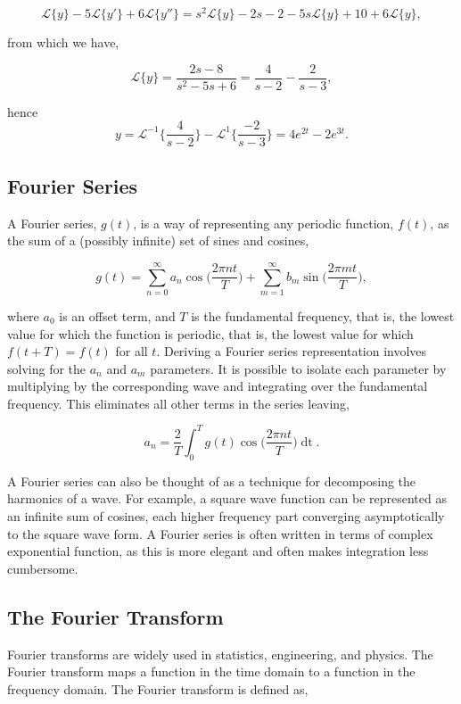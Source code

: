 \documentclass[11pt]{amsart}
\begin{document}
$$\mathcal{L}\{y\} - 5\mathcal{L}\{y'\} + 6\mathcal{L}\{y''\} = s^2\mathcal{L}\{y\} - 2s - 2 - 5s\mathcal{L}\{y\} +10 + 6\mathcal{L}\{y\},$$

from which we have,

$$\mathcal{L}\{y\} = \frac{2s - 8}{s^2 - 5s + 6} = \frac{4}{s - 2} - \frac{2}{s - 3},$$

hence $$y = \mathcal{L}^{-1}\bigg\{\frac{4}{s - 2}\bigg\} - \mathcal{L}^{1}\bigg\{\frac{-2}{s - 3}\bigg\} = 4e^{2t} - 2e^{3t}.$$

\subsection{Fourier Series}

A Fourier series, $g(t)$, is a way of representing any periodic function, $f(t)$, as the sum of a (possibly infinite) set of sines and cosines,

$$g(t) = \sum_{n=0}^{\infty}a_n\cos\bigg(\frac{2\pi nt}{T}\bigg) + \sum_{m=1}^{\infty}b_m\sin\bigg(\frac{2\pi mt}{T}\bigg),$$

where $a_0$ is an offset term, and $T$ is the fundamental frequency, that is, the lowest value for which the function is periodic, that is, the lowest value for which $f(t + T) = f(t)$ for all $t$. Deriving a Fourier series representation involves solving for the $a_n$ and $a_m$ parameters. It is possible to isolate each parameter by multiplying by the corresponding wave and integrating over the fundamental frequency. This eliminates all other terms in the series leaving,

$$a_n = \frac{2}{T}\int_0^Tg(t)\cos\bigg(\frac{2\pi nt}{T}\bigg)\mathop{dt}.$$

A Fourier series can also be thought of as a technique for decomposing the harmonics of a wave. For example, a square wave function can be represented as an infinite sum of cosines, each higher frequency part converging asymptotically to the square wave form. A Fourier series is often written in terms of complex exponential function, as this is more elegant and often makes integration less cumbersome.

\subsection{The Fourier Transform}

Fourier transforms are widely used in statistics, engineering, and physics. The Fourier transform maps a function in the time domain to a function in the frequency domain. The Fourier transform is defined as,
\end{document}
